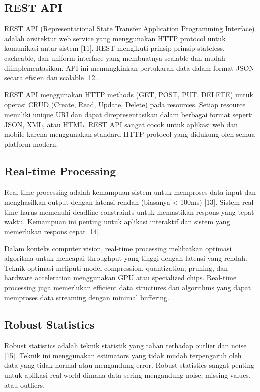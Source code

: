 \documentclass[12pt,a4paper]{report}
\begin{document}
\subsection{REST API}

REST API (Representational State Transfer Application Programming Interface) adalah arsitektur web service yang menggunakan HTTP protocol untuk komunikasi antar sistem [11]. REST mengikuti prinsip-prinsip stateless, cacheable, dan uniform interface yang membuatnya scalable dan mudah diimplementasikan. API ini memungkinkan pertukaran data dalam format JSON secara efisien dan scalable [12].

REST API menggunakan HTTP methods (GET, POST, PUT, DELETE) untuk operasi CRUD (Create, Read, Update, Delete) pada resources. Setiap resource memiliki unique URI dan dapat direpresentasikan dalam berbagai format seperti JSON, XML, atau HTML. REST API sangat cocok untuk aplikasi web dan mobile karena menggunakan standard HTTP protocol yang didukung oleh semua platform modern.

\subsection{Real-time Processing}

Real-time processing adalah kemampuan sistem untuk memproses data input dan menghasilkan output dengan latensi rendah (biasanya < 100ms) [13]. Sistem real-time harus memenuhi deadline constraints untuk memastikan respons yang tepat waktu. Kemampuan ini penting untuk aplikasi interaktif dan sistem yang memerlukan respons cepat [14].

Dalam konteks computer vision, real-time processing melibatkan optimasi algoritma untuk mencapai throughput yang tinggi dengan latensi yang rendah. Teknik optimasi meliputi model compression, quantization, pruning, dan hardware acceleration menggunakan GPU atau specialized chips. Real-time processing juga memerlukan efficient data structures dan algorithms yang dapat memproses data streaming dengan minimal buffering.

\subsection{Robust Statistics}

Robust statistics adalah teknik statistik yang tahan terhadap outlier dan noise [15]. Teknik ini menggunakan estimators yang tidak mudah terpengaruh oleh data yang tidak normal atau mengandung error. Robust statistics sangat penting untuk aplikasi real-world dimana data sering mengandung noise, missing values, atau outliers.
\end{document}
